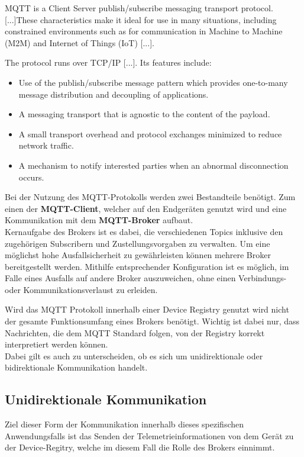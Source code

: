 \begin{definition}[MQTT]
    MQTT\autocite{standard2014mqtt} is a Client Server publish/subscribe messaging transport protocol. [...]These characteristics make it ideal for use in many situations, including constrained environments such as for communication in Machine to Machine (M2M) and Internet of Things (IoT) [...].

    The protocol runs over TCP/IP [...]. Its features include:

    \begin{itemize}
        \item Use of the publish/subscribe message pattern which provides one-to-many message distribution and decoupling of applications.
        \item A messaging transport that is agnostic to the content of the payload.
        \item A small transport overhead and protocol exchanges minimized to reduce network traffic.
        \item A mechanism to notify interested parties when an abnormal disconnection occurs.
    \end{itemize}
\end{definition}

Bei der Nutzung des MQTT-Protokolls werden zwei Bestandteile benötigt. Zum einen der \textbf{MQTT-Client}, welcher auf den Endgeräten genutzt wird und eine Kommunikation mit dem \textbf{MQTT-Broker} aufbaut.\\ Kernaufgabe des Brokers ist es dabei, die verschiedenen Topics inklusive den zugehörigen Subscribern und Zustellungsvorgaben zu verwalten. Um eine möglichst hohe Ausfallsicherheit zu gewährleisten können mehrere Broker bereitgestellt werden. Mithilfe entsprechender Konfiguration ist es möglich, im Falle eines Ausfalls auf andere Broker auszuweichen, ohne einen Verbindungs- oder Kommunikationsverlaust zu erleiden.

Wird das \ac{MQTT} Protokoll innerhalb einer Device Registry genutzt wird nicht der gesamte Funktionsumfang eines Brokers benötigt. Wichtig ist dabei nur, dass Nachrichten, die dem \ac{MQTT} Standard folgen, von der Registry korrekt interpretiert werden können.\\
Dabei gilt es auch zu unterscheiden, ob es sich um unidirektionale oder bidirektionale Kommunikation handelt. 

\subsection*{Unidirektionale Kommunikation}
Ziel dieser Form der Kommunikation innerhalb dieses spezifischen Anwendungsfalls ist das Senden der Telemetrieinformationen von dem Gerät zu der Device-Regitry, welche im diesem Fall die Rolle des Brokers einnimmt.

